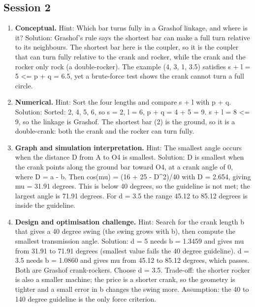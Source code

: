 \documentclass[11pt,a4paper]{article}
\begin{document}
\subsection*{Session 2}
\begin{enumerate}[nosep]
\item \textbf{Conceptual.} Hint: Which bar turns fully in a Grashof linkage, and where is it? Solution: Grashof's rule says the shortest bar can make a full turn relative to its neighbours. The shortest bar here is the coupler, so it is the coupler that can turn fully relative to the crank and rocker, while the crank and the rocker only rock (a double-rocker). The example (4, 3, 1, 3.5) satisfies s + l = 5 \textless{}= p + q = 6.5, yet a brute-force test shows the crank cannot turn a full circle.
\item \textbf{Numerical.} Hint: Sort the four lengths and compare s + l with p + q. Solution: Sorted: 2, 4, 5, 6, so s = 2, l = 6, p + q = 4 + 5 = 9. s + l = 8 \textless{}= 9, so the linkage is Grashof. The shortest bar (2) is the ground, so it is a double-crank: both the crank and the rocker can turn fully.
\item \textbf{Graph and simulation interpretation.} Hint: The smallest angle occurs when the distance D from A to O4 is smallest. Solution: D is smallest when the crank points along the ground bar toward O4, at a crank angle of 0, where D = a - b. Then cos(mu) = (16 + 25 - D\textasciicircum{}2)/40 with D = 2.654, giving mu = 31.91 degrees. This is below 40 degrees, so the guideline is not met; the largest angle is 71.91 degrees. For d = 3.5 the range 45.12 to 85.12 degrees is inside the guideline.
\item \textbf{Design and optimisation challenge.} Hint: Search for the crank length b that gives a 40 degree swing (the swing grows with b), then compute the smallest transmission angle. Solution: d = 5 needs b = 1.3459 and gives mu from 31.91 to 71.91 degrees (smallest value fails the 40 degree guideline). d = 3.5 needs b = 1.0860 and gives mu from 45.12 to 85.12 degrees, which passes. Both are Grashof crank-rockers. Choose d = 3.5. Trade-off: the shorter rocker is also a smaller machine; the price is a shorter crank, so the geometry is tighter and a small error in b changes the swing more. Assumption: the 40 to 140 degree guideline is the only force criterion.
\end{enumerate}
\end{document}
